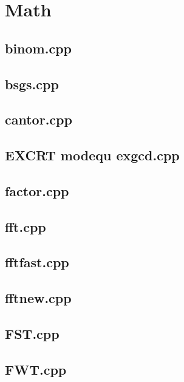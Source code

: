 \section{Math}

\subsection{binom.cpp}


\subsection{bsgs.cpp}


\subsection{cantor.cpp}


\subsection{EXCRT modequ exgcd.cpp}


\subsection{factor.cpp}


\subsection{fft.cpp}


\subsection{fftfast.cpp}


\subsection{fftnew.cpp}


\subsection{FST.cpp}


\subsection{FWT.cpp}


